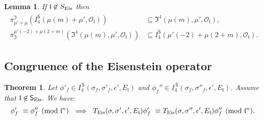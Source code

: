 \documentclass[11pt]{amsart}
\newtheorem{theorem}{Theorem}[section]
\newtheorem{lemma}{Lemma}[section]
\begin{document}
\begin{lemma}
	If $\mathfrak{l} \not\in S_{\textup{Eis}}$ then
	\begin{align}
		\begin{aligned}
			\pi_{\mu' + \mu}^\mathfrak{I} \left(I_4^\mathsf{S}(\mu(m)+ \mu',\mathcal{O}_\mathfrak{l})\right) &\subseteq \mathfrak{I}^4(\mu(m), \mu',\mathcal{O}_\mathfrak{l}), \\
			\pi^{\mu'(-2) + \mu(2+m)}_\mathfrak{I} \left(\mathfrak{I}^4(\mu(m), \mu' , \mathcal{O}_\mathfrak{l}) \right) &\subseteq I_4^\mathsf{S}(\mu'(-2)+\mu(2+m), \mathcal{O}_\mathfrak{l}).
		\end{aligned}
	\end{align} 
\end{lemma}


\medskip
\subsection{Congruence of the Eisenstein operator} 
\label{section: congruence-of-the-eisenstein-operator}

\begin{theorem}
\label{thm: congruence-of-eisenstein-operators}
Let $\phi'_f \in I_4^{\,\mathsf{S}}(\sigma_f, \sigma'_f, \epsilon', E_\mathfrak{l})$ and 
$\phi_f'' \in I_4^{\,\mathsf{S}}(\sigma_f, \sigma''_f, \epsilon', E_{\mathfrak{l}})$. Assume that $\mathfrak{l} \not\in \mathsf{S}_{\textup{Eis}}.$ We have:
$$ 
\phi'_f \,\,\equiv \phi_f'' \pmod{\mathfrak{l}^n} \ \implies \ 
T_{\textup{Eis}}(\sigma, \sigma', \epsilon', E_\mathfrak{l}) \phi'_f \,\,\equiv T_{\textup{Eis}}(\sigma, \sigma'', \epsilon',  E_\mathfrak{l}) \phi''_f \pmod{\mathfrak{l}^n}.
$$
\end{theorem}
\end{document}
